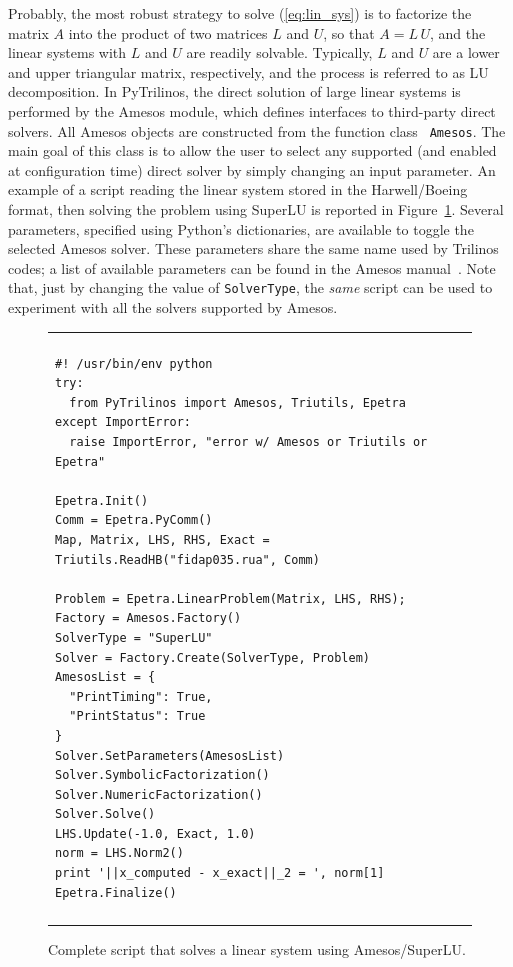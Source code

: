 \documentclass[acmtocl]{acmtrans2m}
\begin{document}
Probably, the most robust strategy to solve (\ref{eq:lin_sys}) is to
factorize the matrix $A$ into the product of two matrices $L$ and
$U$, so that $A = L \, U$, and the linear systems with $L$ and $U$
are readily solvable. Typically, $L$ and $U$ are a lower and upper
triangular matrix, respectively, and the process is referred to as
LU decomposition. In PyTrilinos, the direct solution of large linear
systems is performed by the Amesos module, which defines interfaces
to third-party direct solvers. All Amesos objects are constructed
from the function class {\tt
  Amesos}.   The main goal of this class is to allow the user to select
any supported (and enabled at configuration time) direct solver by
simply changing an input parameter. An example of a script reading
the linear system stored in the Harwell/Boeing format, then solving
the problem using SuperLU is reported in Figure~\ref{fig:amesos}.
Several parameters, specified using Python's dictionaries, are
available to toggle the selected Amesos solver. These parameters
share the same name used by Trilinos codes; a list of available
parameters can be found in the Amesos
manual~\cite{Amesos-Reference-Guide}. Note that, just by changing
the value of \verb!SolverType!, the {\sl same} script can be used to
experiment with all the solvers supported by Amesos.

\begin{figure}
\begin{center}
\begin{tabular}{| p{12cm} |}
\hline
\\
\footnotesize
\begin{minipage}{11.5cm}
\begin{verbatim}
#! /usr/bin/env python
try:
  from PyTrilinos import Amesos, Triutils, Epetra
except ImportError:
  raise ImportError, "error w/ Amesos or Triutils or Epetra"

Epetra.Init()
Comm = Epetra.PyComm()
Map, Matrix, LHS, RHS, Exact = Triutils.ReadHB("fidap035.rua", Comm)

Problem = Epetra.LinearProblem(Matrix, LHS, RHS);
Factory = Amesos.Factory()
SolverType = "SuperLU"
Solver = Factory.Create(SolverType, Problem)
AmesosList = {
  "PrintTiming": True,
  "PrintStatus": True
}
Solver.SetParameters(AmesosList)
Solver.SymbolicFactorization()
Solver.NumericFactorization()
Solver.Solve()
LHS.Update(-1.0, Exact, 1.0)
norm = LHS.Norm2()
print '||x_computed - x_exact||_2 = ', norm[1]
Epetra.Finalize()
\end{verbatim}
\end{minipage}
\\
\\
\hline
\end{tabular}
\caption{Complete script that solves a linear system using Amesos/SuperLU.}
\label{fig:amesos}
\end{center}
\end{figure}
\end{document}
